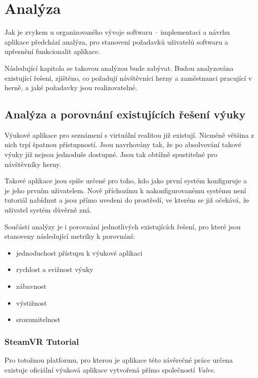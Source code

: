 \chapter{Analýza}\label{analuxfdza}

Jak je zvykem u organizovaného vývoje softwaru -- implementaci a návrhu
aplikace předchází analýza, pro stanovení požadavků uživatelů softwaru a
upřesnění funkcionalit aplikace.

Následující kapitola se takovou analýzou bude zabývat. Budou analyzována
existující řešení, zjištěno, co požadují návštěvníci herny a
zaměstnanci pracující v herně, a jaké požadavky jsou realizovatelné.

\section{Analýza a porovnání existujících řešení
výuky}\label{analuxfdza-a-porovnuxe1nuxed-existujuxedcuxedch-ux159eux161enuxed-vuxfduky}

Výukové aplikace pro seznámení s virtuální realitou již existují.
Nicméně většina z nich trpí špatnou přístupností. Jsou navrhovány tak,
že po absolvování takové výuky již nejsou jednoduše dostupné. Jsou tak
obtížně spustitelné pro návštěvníky herny.

Takové aplikace jsou spíše určené pro toho, kdo jako první systém
konfiguruje a je jeho prvním uživatelem. Nově příchozímu k
nakonfigurovanému systému není tutoriál nabídnut a jsou přímo uvedeni do
prostředí, ve kterém se již očekává, že uživatel systém důvěrně zná.

Součásti analýzy je i porovnání jednotlivých existujících řešení, pro
které jsou stanoveny následující metriky k porovnání:

\begin{itemize}
\tightlist
\item
  jednoduchost přístupu k výukové aplikaci
\item
  rychlost a svižnost výuky
\item
  zábavnost
\item
  výstižnost
\item
  srozumitelnost
\end{itemize}

\subsection{SteamVR Tutorial}\label{steamvr-tutorial}

Pro totožnou platformu, pro kterou je aplikace této závěrečné práce
určena existuje oficiální výuková aplikace vytvořená přímo společností
\emph{Valve}.

